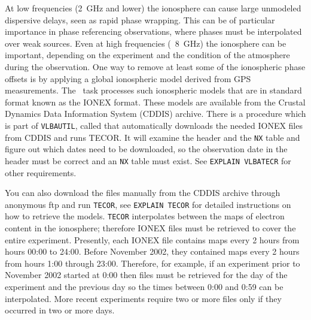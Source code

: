 
At low frequencies (2~GHz and lower) the ionosphere can cause large
unmodeled dispersive delays, seen as rapid phase wrapping.  This can
be of particular importance in phase referencing observations, where
phases must be interpolated over weak sources.  Even at high
frequencies (\eg\ 8~GHz) the ionosphere can be important, depending on
the experiment and the condition of the atmosphere during the
observation.  One way to remove at least some of the ionospheric phase
offsets is by applying a global ionospheric model derived from GPS
measurements.  The \AIPS\ task {\tt {}} processes such
ionospheric models that are in standard format known as the IONEX
format.  These models are available from the Crustal Dynamics Data
Information System (CDDIS) archive.  There is a procedure
which is part of {\tt VLBAUTIL}, called
{\tt {}} that automatically downloads the needed
IONEX files from CDDIS and runs TECOR.  It will examine the header and
the {\tt NX} table and figure out which dates need to be downloaded, so
the observation date in the header must be correct and an {\tt NX}
table must exist.  See {\tt EXPLAIN VLBATECR} for other requirements.


You can also download the files manually from the CDDIS archive
through anonymous ftp and run {\tt TECOR}, see {\tt EXPLAIN TECOR} for
detailed instructions on how to retrieve the models.  {\tt TECOR}
interpolates between the maps of electron content in the ionosphere;
therefore IONEX files must be retrieved to cover the entire
experiment.  Presently, each IONEX file contains maps every 2 hours
from hours 00:00 to 24:00.  Before November 2002, they contained maps
every 2 hours from hours 1:00 through 23:00.  Therefore, for example,
if an experiment prior to November 2002 started at 0:00 then files
must be retrieved for the day of the experiment and the previous day
so the times between 0:00 and 0:59 can be interpolated.  More recent
experiments require two or more files only if they occurred in two or
more days.

